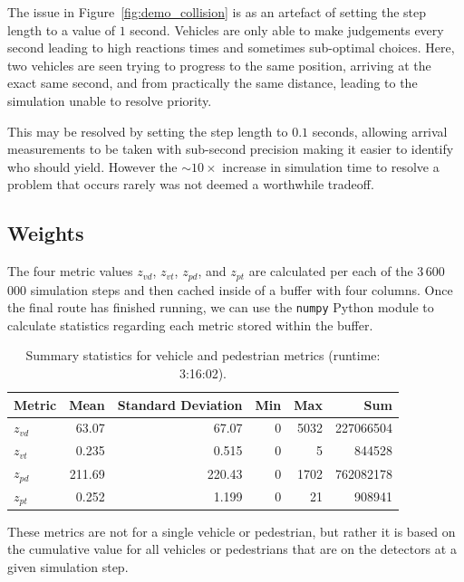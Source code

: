\documentclass[a4paper]{report}
\begin{document}
The issue in Figure~\ref{fig:demo_collision} is as an artefact of setting the step length to a value of $1$ second. Vehicles are only able to make judgements every second leading to high reactions times and sometimes sub-optimal choices. Here, two vehicles are seen trying to progress to the same position, arriving at the exact same second, and from practically the same distance, leading to the simulation unable to resolve priority.

This may be resolved by setting the step length to $0.1$ seconds, allowing arrival measurements to be taken with sub-second precision making it easier to identify who should yield. However the $\sim10\times$ increase in simulation time to resolve a problem that occurs rarely was not deemed a worthwhile tradeoff.

\subsection{Weights}

The four metric values $z_{vd}$, $z_{vt}$, $z_{pd}$, and $z_{pt}$ are calculated per each of the 3\,600\,000 simulation steps and then cached inside of a buffer with four columns. Once the final route has finished running, we can use the \texttt{numpy} Python module to calculate statistics regarding each metric stored within the buffer.

\begin{table}[H]
  \centering
  \begin{tabular}{lrrrrr}
    \hline
    \textbf{Metric} & \textbf{Mean} & \textbf{Standard Deviation} & \textbf{Min} & \textbf{Max} & \textbf{Sum} \\
    \hline
    $z_{vd}$ & 63.07 & 67.07 & 0 & 5032 & 227066504 \\
    $z_{vt}$ & 0.235 & 0.515 & 0 & 5 & 844528 \\
    $z_{pd}$ & 211.69 & 220.43 & 0 & 1702 & 762082178 \\
    $z_{pt}$ & 0.252 & 1.199 & 0 & 21 & 908941 \\
    \hline
  \end{tabular}
  \caption{Summary statistics for vehicle and pedestrian metrics (runtime: 3:16:02).}
  \label{summary_statistics}
\end{table}

These metrics are not for a single vehicle or pedestrian, but rather it is based on the cumulative value for all vehicles or pedestrians that are on the detectors at a given simulation step.
\end{document}
